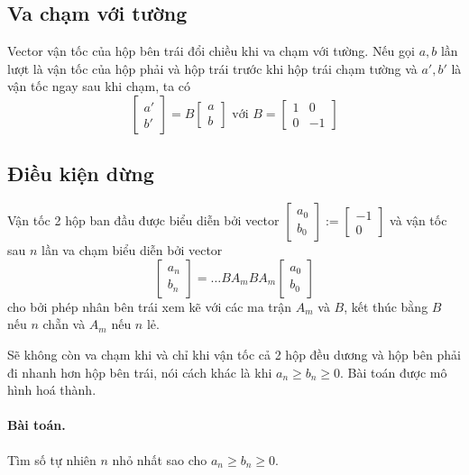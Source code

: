 \documentclass[11pt]{article}
\begin{document}
\subsection*{Va chạm với tường}
\label{sec:orga9110e9}
Vector vận tốc của hộp bên trái đổi chiều khi va chạm với tường. Nếu gọi \(a,b\) lần lượt là
vận tốc của hộp phải và hộp trái trước khi hộp trái chạm tường
và \(a', b'\) là vận tốc ngay sau khi chạm, ta có 
\begin{equation*}
\begin{bmatrix} a' \\ b'  \end{bmatrix} 
= B  \begin{bmatrix} a \\ b \end{bmatrix}
\text{ với } B = \begin{bmatrix}1 & 0 \\ 0 & -1 \end{bmatrix}
\end{equation*}


\subsection*{Điều kiện dừng}
\label{sec:orgd0dc201}
Vận tốc 2 hộp ban đầu được biểu diễn bởi vector \(\begin{bmatrix} a_0\\b_0 \end{bmatrix}
:= \begin{bmatrix} -1\\0 \end{bmatrix}\) và vận tốc sau \(n\) lần va chạm biểu diễn bởi
vector
\begin{equation*}
 \begin{bmatrix} a_n\\b_n \end{bmatrix} = \dots B A_m B A_m \begin{bmatrix} a_0\\b_0 \end{bmatrix}
\end{equation*}
cho bởi phép nhân bên trái xem kẽ với các ma trận \(A_m\) và \(B\), kết thúc bằng \(B\) nếu \(n\) chẵn và \(A_m\) nếu \(n\) lẻ.

Sẽ không còn va chạm khi và chỉ khi vận tốc cả 2 hộp đều dương và hộp bên phải đi nhanh
hơn hộp bên trái, nói cách khác là khi \(a_n\geq b_n\geq 0\). Bài toán được mô hình hoá
thành.

\paragraph*{Bài toán.}
\label{sec:org8b375c5}
Tìm số tự nhiên \(n\) nhỏ nhất sao cho \(a_n\geq b_n \geq 0\).
\end{document}
